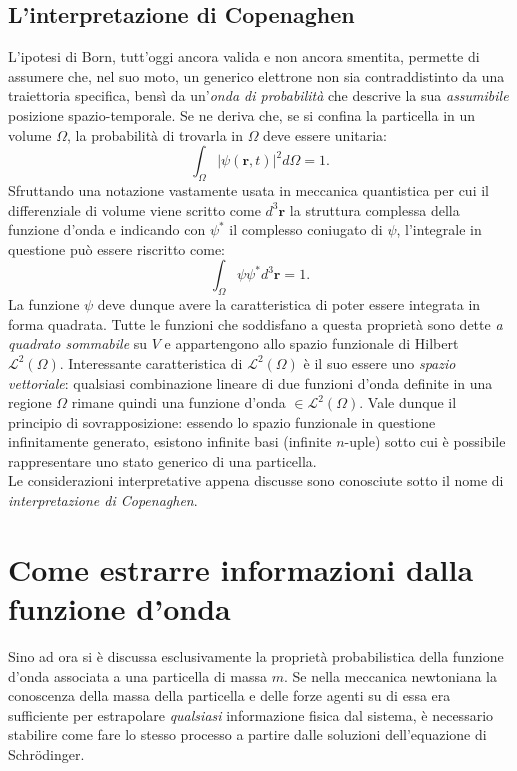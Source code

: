 \documentclass[a4paper,11pt]{report}
\begin{document}
\subsection{L'interpretazione di Copenaghen}
L'ipotesi di Born, tutt'oggi ancora valida e non ancora smentita, permette di assumere che, nel suo moto, un generico elettrone non sia contraddistinto da una traiettoria specifica, bensì da un'\textit{onda di probabilità} che descrive la sua \textit{assumibile} posizione spazio-temporale. Se ne deriva che, se si confina la particella in un volume $\Omega$, la probabilità di trovarla in $\Omega$ deve essere unitaria:
\begin{equation}
    \int_\Omega |\psi(\bm{r}, t)|^2 d\Omega = 1.
\end{equation}
Sfruttando una notazione vastamente usata in meccanica quantistica per cui il differenziale di volume viene scritto come $d^3\bm{r}$ la struttura complessa della funzione d'onda e indicando con $\psi^*$ il complesso coniugato di $\psi$, l'integrale in questione può essere riscritto come:
\begin{equation}
    \int_\Omega \psi \psi^* d^3\bm{r} = 1.
\end{equation}
La funzione $\psi$ deve dunque avere la caratteristica di poter essere integrata in forma quadrata. Tutte le funzioni che soddisfano a questa proprietà sono dette \textit{a quadrato sommabile} su $V$ e appartengono allo spazio funzionale di Hilbert $\mathcal{L}^2(\Omega)$. Interessante caratteristica di $\mathcal{L}^2(\Omega)$ è il suo essere uno \textit{spazio vettoriale}: qualsiasi combinazione lineare di due funzioni d'onda definite in una regione $\Omega$ rimane quindi una funzione d'onda $\in \mathcal{L}^2(\Omega)$. Vale dunque il principio di sovrapposizione: essendo lo spazio funzionale in questione infinitamente generato, esistono infinite basi (infinite $n$-uple) sotto cui è possibile rappresentare uno stato generico di una particella. \\

\noindent
Le considerazioni interpretative appena discusse sono conosciute sotto il nome di \textit{interpretazione di Copenaghen}.

\section{Come estrarre informazioni dalla funzione d'onda}
Sino ad ora si è discussa esclusivamente la proprietà probabilistica della funzione d'onda associata a una particella di massa $m$. Se nella meccanica newtoniana la conoscenza della massa della particella e delle forze agenti su di essa era sufficiente per estrapolare \textit{qualsiasi} informazione fisica dal sistema, è necessario stabilire come fare lo stesso processo a partire dalle soluzioni dell'equazione di Schrödinger. 
\end{document}

